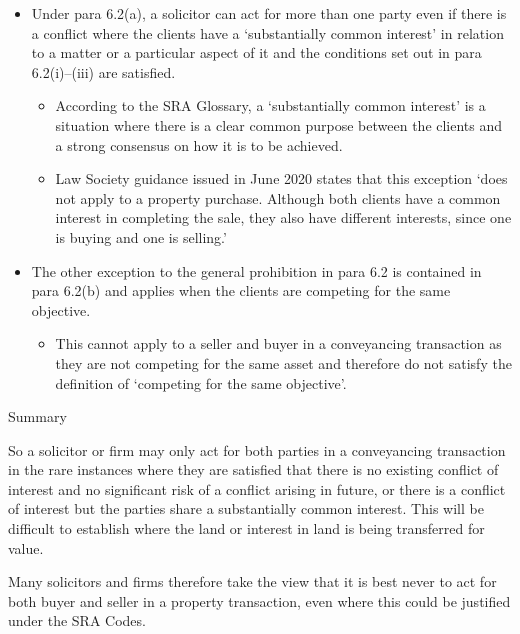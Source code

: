 \documentclass[
]{article}
\providecommand{\tightlist}{%
  \setlength{\itemsep}{0pt}\setlength{\parskip}{0pt}}
\newenvironment{env-d6ce83a0-f7a8-46b6-be95-b1235f1feb63}
{
    \savenotes\tcolorbox[blanker,breakable,left=5pt,borderline west={2pt}{-4pt}{gray}]
}
{
    \endtcolorbox\spewnotes
}
\begin{document}
\begin{itemize}
\tightlist
\item
  Under para 6.2(a), a solicitor can act for more than one party even if
  there is a conflict where the clients have a `substantially common
  interest' in relation to a matter or a particular aspect of it and the
  conditions set out in para 6.2(i)--(iii) are satisfied.

  \begin{itemize}
  \tightlist
  \item
    According to the SRA Glossary, a `substantially common interest' is
    a situation where there is a clear common purpose between the
    clients and a strong consensus on how it is to be achieved.
  \item
    Law Society guidance issued in June 2020 states that this exception
    `does not apply to a property purchase. Although both clients have a
    common interest in completing the sale, they also have different
    interests, since one is buying and one is selling.'
  \end{itemize}
\item
  The other exception to the general prohibition in para 6.2 is
  contained in para 6.2(b) and applies when the clients are competing
  for the same objective.

  \begin{itemize}
  \tightlist
  \item
    This cannot apply to a seller and buyer in a conveyancing
    transaction as they are not competing for the same asset and
    therefore do not satisfy the definition of `competing for the same
    objective'.
  \end{itemize}
\end{itemize}

\begin{env-d6ce83a0-f7a8-46b6-be95-b1235f1feb63}

Summary

So a solicitor or firm may only act for both parties in a conveyancing
transaction in the rare instances where they are satisfied that there is
no existing conflict of interest and no significant risk of a conflict
arising in future, or there is a conflict of interest but the parties
share a substantially common interest. This will be difficult to
establish where the land or interest in land is being transferred for
value.

Many solicitors and firms therefore take the view that it is best never
to act for both buyer and seller in a property transaction, even where
this could be justified under the SRA Codes.

\end{env-d6ce83a0-f7a8-46b6-be95-b1235f1feb63}
\end{document}
